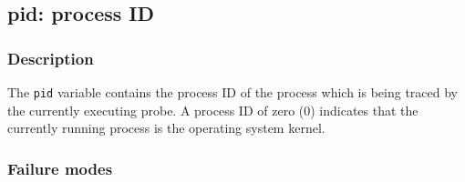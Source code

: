 \clearpage
{}
{}
\label{vars:pid}
\subsection*{pid: process ID}

\subsubsection*{Description}

The \verb|pid| variable contains the process ID of the process which
is being traced by the currently executing probe.  A process ID of
zero (0) indicates that the currently running process is the operating
system kernel.

\subsubsection*{Failure modes}

